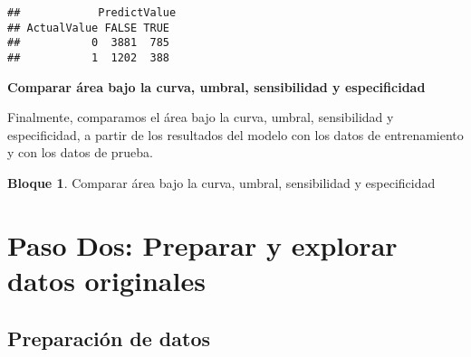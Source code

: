 \documentclass[
]{book}
\newenvironment{Shaded}{\begin{snugshade}}{\end{snugshade}}
\newcommand{\NormalTok}[1]{#1}
\newcommand{\OtherTok}[1]{\textcolor[rgb]{0.56,0.35,0.01}{#1}}
\newcommand{\SpecialCharTok}[1]{\textcolor[rgb]{0.00,0.00,0.00}{#1}}
\theoremstyle{definition}
\theoremstyle{definition}
\newtheorem{example}{Bloque}[chapter]
\theoremstyle{definition}
\theoremstyle{definition}
\theoremstyle{remark}
\begin{document}
\begin{verbatim}
##            PredictValue
## ActualValue FALSE TRUE
##           0  3881  785
##           1  1202  388
\end{verbatim}

\textbf{Comparar área bajo la curva, umbral, sensibilidad y especificidad}

Finalmente, comparamos el área bajo la curva, umbral, sensibilidad y especificidad, a partir de los resultados del modelo con los datos de entrenamiento y con los datos de prueba.

\begin{example}
\protect\hypertarget{exm:bloque25nbm}{}\label{exm:bloque25nbm}Comparar área bajo la curva, umbral, sensibilidad y especificidad
\end{example}

\begin{Shaded}
\end{Shaded}

\hypertarget{paso-dos-preparar-y-explorar-datos-originales}{%
\section{Paso Dos: Preparar y explorar datos originales}\label{paso-dos-preparar-y-explorar-datos-originales}}

\hypertarget{preparaciuxf3n-de-datos}{%
\subsection{Preparación de datos}\label{preparaciuxf3n-de-datos}}
\end{document}
